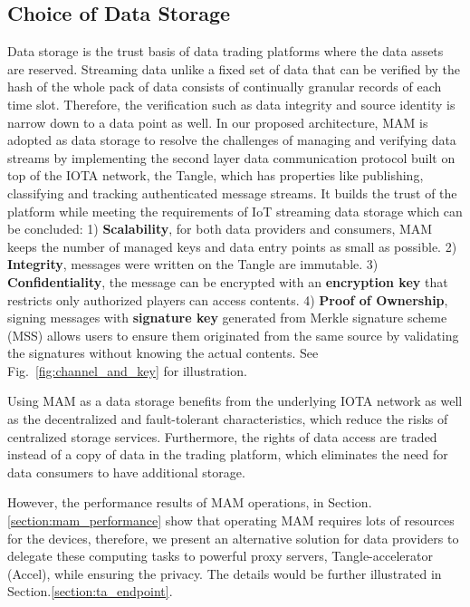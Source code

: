 \documentclass[10pt, conference, compsocconf]{IEEEtran}
\begin{document}
\subsection{Choice of Data Storage}
Data storage is the trust basis of data trading platforms where the data assets are reserved. Streaming data unlike a fixed set of data that can be verified by the hash of the whole pack of data consists of continually granular records of each time slot. Therefore, the verification such as data integrity and source identity is narrow down to a data point as well. In our proposed architecture, MAM is adopted as data storage to resolve the challenges of managing and verifying data streams by implementing the second layer data communication protocol built on top of the IOTA network, the Tangle, which has properties like publishing, classifying and tracking authenticated message streams. It builds the trust of the platform while meeting the requirements of IoT streaming data storage which can be concluded: 1) \textbf{Scalability}, for both data providers and consumers, MAM keeps the number of managed keys and data entry points as small as possible. 2) \textbf{Integrity}, messages were written on the Tangle are immutable. 3) \textbf{Confidentiality}, the message can be encrypted with an \textbf{encryption key} that restricts only authorized players can access contents. 4) \textbf{Proof of Ownership}, signing messages with \textbf{signature key} generated from Merkle signature scheme\cite{MSS} (MSS) allows users to ensure them originated from the same source by validating the signatures without knowing the actual contents. See Fig.~\ref{fig:channel_and_key} for illustration.

Using MAM as a data storage benefits from the underlying IOTA network as well as the decentralized and fault-tolerant characteristics, which reduce the risks of centralized storage services. Furthermore, the rights of data access are traded instead of a copy of data in the trading platform, which eliminates the need for data consumers to have additional storage.

However, the performance results of MAM operations, in Section.\ref{section:mam_performance} show that operating MAM requires lots of resources for the devices, therefore, we present an alternative solution for data providers to delegate these computing tasks to powerful proxy servers, Tangle-accelerator (Accel)\cite{TA}, while ensuring the privacy. The details would be further illustrated in Section.\ref{section:ta_endpoint}.
\end{document}
